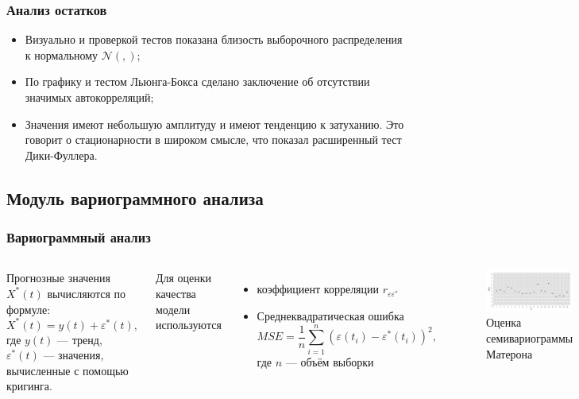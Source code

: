 \documentclass[10pt,pdf,aspectratio=169,hyperref={unicode},notheorems]{beamer}
\theoremstyle{definition}
\theoremstyle{example}
\theoremstyle{plain}
\newcommand{\inp}[1]{}
\newcommand{\descriptive}[2]{\inp{#1/descriptive/#2}}
\newcommand{\resnormaldistr}{$\mathcal{N}(\descriptive{residual}{mean}, \descriptive{residual}{variance})$}
\begin{document}
\begin{frame}
  \frametitle{Анализ остатков}
  \begin{itemize}
    \item Визуально и проверкой тестов показана близость выборочного распределения к нормальному \resnormaldistr;
    \item По графику и тестом Льюнга-Бокса сделано заключение об отсутствии значимых автокорреляций;
    \item Значения имеют небольшую амплитуду и имеют тенденцию к затуханию. Это говорит о стационарности в широком смысле, что показал расширенный тест Дики-Фуллера.
  \end{itemize}
\end{frame}

\subsection{Модуль вариограммного анализа}

\begin{frame}
  \frametitle{Вариограммный анализ}
  \begin{columns}[c]
  \column{3in}
    Прогнозные значения $ X^{*}(t) $ вычисляются по формуле:
    \begin{equation*}
      X^{*}(t) = y(t) + \varepsilon^{*}(t),
    \end{equation*}
    где $ y(t) $ --- тренд, $ \varepsilon^{*}(t) $ --- значения, вычисленные с помощью кригинга.

    \vspace{0.5em}

    Для оценки качества модели используются
    \begin{itemize}
      \item коэффициент корреляции $ r_{\varepsilon\varepsilon^{*}} $
      \item Среднеквадратическая ошибка
        \begin{equation}
        \label{eq:mse}
          MSE = \frac{1}{n} \sum_{i=1}^{n} (\varepsilon(t_i) - \varepsilon^{*}(t_i))^2,
        \end{equation}
        где $ n $ --- объём выборки
    \end{itemize}

  \column{3in}
    \begin{figure}[h]
    \includegraphics[width=1\linewidth]{../../figures/variogram/lin-variogram.png}
    \caption{Оценка семивариограммы Матерона}
  \end{figure}
  \end{columns}
\end{frame}
\end{document}
